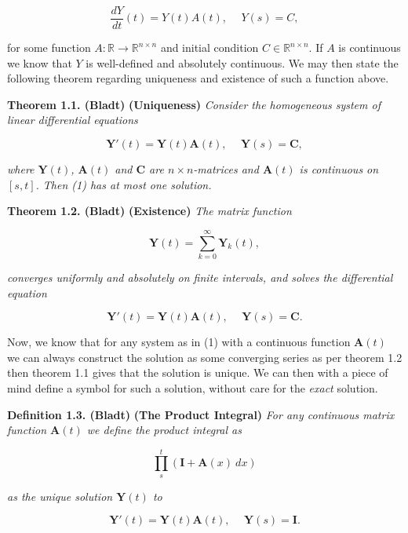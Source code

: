 \documentclass[
]{book}
\begin{document}
\[
\frac{dY}{dt}(t)=Y(t)A(t),\hspace{15pt}Y(s)=C,
\]

for some function \(A : \mathbb{R}\to\mathbb{R}^{n\times n}\) and initial condition \(C\in \mathbb{R}^{n\times n}\). If \(A\) is continuous we know that \(Y\) is well-defined and absolutely continuous. We may then state the following theorem regarding uniqueness and existence of such a function above.

\textbf{Theorem 1.1. (Bladt)} \textbf{(Uniqueness)} \emph{Consider the homogeneous system of linear differential equations}

\[
\mathbf{Y}'(t)=\mathbf{Y}(t)\mathbf{A}(t),\hspace{15pt} \mathbf{Y}(s)=\mathbf{C},\tag{1}
\]

\emph{where \(\mathbf{Y}(t)\), \(\mathbf{A}(t)\) and \(\mathbf{C}\) are \(n\times n\)-matrices and \(\mathbf{A}(t)\) is continuous on \([s,t]\). Then (1) has at most one solution.}

\textbf{Theorem 1.2. (Bladt)} \textbf{(Existence)} \emph{The matrix function}

\[
\mathbf{Y}(t)=\sum_{k=0}^\infty \mathbf{Y}_k(t),\tag{3}
\]

\emph{converges uniformly and absolutely on finite intervals, and solves the differential equation}

\[
\mathbf{Y}'(t)=\mathbf{Y}(t)\mathbf{A}(t),\hspace{15pt} \mathbf{Y}(s)=\mathbf{C}.
\]

Now, we know that for any system as in (1) with a continuous function \(\mathbf{A}(t)\) we can always construct the solution as some converging series as per theorem 1.2 then theorem 1.1 gives that the solution is unique. We can then with a piece of mind define a symbol for such a solution, without care for the \emph{exact} solution.

\textbf{Definition 1.3. (Bladt)} \textbf{(The Product Integral)} \emph{For any continuous matrix function \(\mathbf{A}(t)\) we define the product integral as}

\[
\prod_{s}^t(\mathbf{I}+\mathbf{A}(x)\ dx)
\]

\emph{as the unique solution \(\mathbf{Y}(t)\) to}

\[
\mathbf{Y}'(t)=\mathbf{Y}(t)\mathbf{A}(t),\hspace{15pt} \mathbf{Y}(s)=\mathbf{I}.
\]
\end{document}
